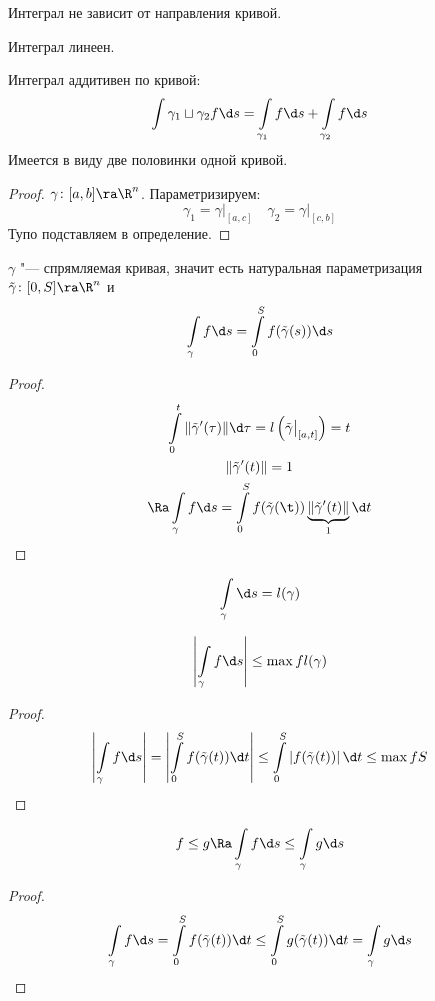 \item
	Интеграл не зависит от направления кривой.

\item
	Интеграл линеен.

\item
	Интеграл аддитивен по кривой:
	\[ \int\limits{\gamma_1 \sqcup \gamma_2} f \d s = \int\limits_{\gamma_1} f \d s + \int\limits_{\gamma_2} f \d s \]
	Имеется в виду две половинки одной кривой.
	\begin{proof}
		$\gamma\colon [a, b] \ra \R^n$.
		Параметризируем:
		\[ \gamma_1 = \gamma \bigr|_{[a, c]} \quad \gamma_2 = \gamma \bigr|_{[c, b]} \]
		Тупо подставляем в определение.
	\end{proof}

\item
	$\gamma$ "--- спрямляемая кривая, значит есть натуральная параметризация $\tilde \gamma\colon [0, S] \ra \R^n$ и
	\[ \int\limits_\gamma f \d s = \int\limits_0^S f(\tilde \gamma(s)) \d s \]
	\begin{proof}
		\begin{gather*}
			\int\limits_0^t \|\tilde\gamma'(\tau)\| \d \tau = l\left(\tilde \gamma \bigr|_{[a, t]}\right) = t \\
			\|\tilde\gamma'(t)\| = 1 \\
			\Ra \int\limits_\gamma f \d s = \int\limits_0^S f(\tilde\gamma(\t)) \underbrace{\|\tilde\gamma'(t)\|}_1 \d t
		\end{gather*}
	\end{proof}

\item
	\[ \int\limits_\gamma \d s = l(\gamma) \]

\item
	\[ \left| \int\limits_\gamma f \d s \right| \le \max f l(\gamma) \]
	\begin{proof}
		\begin{gather*}
			\left| \int\limits_\gamma f \d s \right|
			= \left| \int\limits_0^S f(\tilde\gamma(t)) \d t \right|
			\le \int\limits_0^S \left| f(\tilde\gamma(t)) \right| \d t \le \max f S
		\end{gather*}
	\end{proof}

\item
	\[ f \le g \Ra \int\limits_\gamma f \d s \le \int\limits_\gamma g \d s \]
	\begin{proof}
		\[
			\int\limits_\gamma f \d s = \int\limits_0^S f(\tilde\gamma(t)) \d t
			\le \int\limits_0^S g(\tilde\gamma(t)) \d t = \int\limits_\gamma g \d s
		\]
	\end{proof}

